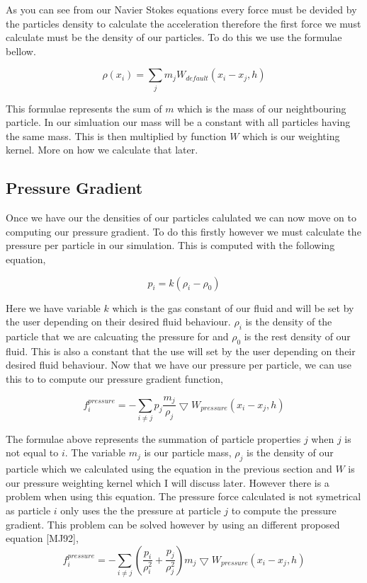 As you can see from our Navier Stokes equations every force must be devided by the particles density to calculate the acceleration therefore the first force we must calculate must be the density of our particles. To do this we use the formulae bellow.\par
 \[ \rho(x_i)= \sum\limits_{j}m_j W_{default}(x_i-x_j,h) \]\par
 This formulae represents the sum of $m$ which is the mass of our neightbouring particle. In our simluation our mass will be a constant with all particles having the same mass. This is then multiplied by function $W$ which is our weighting kernel. More on how we calculate that later.

\subsection*{Pressure Gradient }

Once we have our the densities of our particles calulated we can now move on to computing our pressure gradient. To do this firstly however we must calculate the pressure per particle in our simulation. This is computed with the following equation,\par
 \[ p_i = k(\rho_i - \rho_0) \]\par
 Here we have variable $k$ which is the gas constant of our fluid and will be set by the user depending on their desired fluid behaviour. $\rho_i$ is the density of the particle that we are calcuating the pressure for and $\rho_0$ is the rest density of our fluid. This is also a constant that the use will set by the user depending on their desired fluid behaviour. Now that we have our pressure per particle, we can use this to to compute our pressure gradient function,\par
 \[ f_i^{pressure} = -\sum\limits_{i\neq j}p_j\frac{m_j}{\rho_j}\bigtriangledown W_{pressure}(x_i-x_j,h) \]\par
The formulae above represents the summation of particle properties $j$ when $j$ is not equal to $i$. The variable $m_j$ is our particle mass, $\rho_j$ is the density of our particle which we calculated using the equation in the previous section and $W$ is our pressure weighting kernel which I will discuss later. However there is a problem when using this equation. The pressure force calculated is not symetrical as particle $i$ only uses the the pressure at particle $j$ to compute the pressure gradient. This problem can be solved however by using an different proposed equation \mbox{[}M\-J92\mbox{]}, \[ f_i^{pressure} = -\sum\limits_{i\neq j}(\frac{p_i}{\rho_i^2} + \frac{p_j}{\rho_j^2})m_j\bigtriangledown W_{pressure}(x_i-x_j,h) \]

